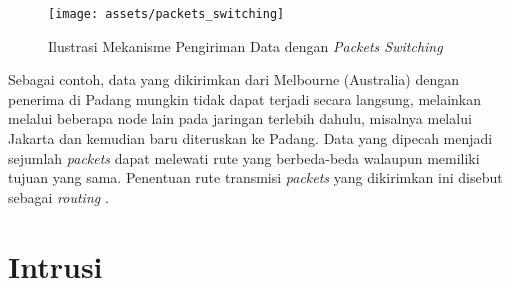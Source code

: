 \documentclass[a4paper,12pt]{report}
\begin{document}
\begin{figure}[H]
	\center \texttt{[image: assets/packets\_switching]}
	\caption{Ilustrasi Mekanisme Pengiriman Data dengan \textit{Packets Switching}} 
	\label{packets_switching}
\end{figure}

Sebagai contoh, data yang dikirimkan dari Melbourne (Australia) dengan penerima di Padang mungkin tidak dapat terjadi secara langsung, melainkan melalui beberapa node lain pada jaringan terlebih dahulu, misalnya melalui Jakarta dan kemudian baru diteruskan ke Padang. Data yang dipecah menjadi sejumlah \textit{packets} dapat melewati rute yang berbeda-beda walaupun memiliki tujuan yang sama. Penentuan rute transmisi \textit{packets} yang dikirimkan ini disebut sebagai \textit{routing} \cite{tanenbaumComputerNetworks2011}.

\section{Intrusi}
\end{document}
